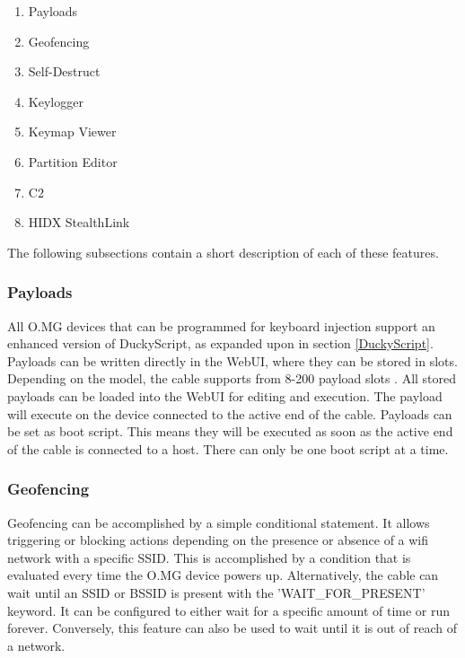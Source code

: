 \begin{enumerate}
    \item Payloads
    \item Geofencing
    \item Self-Destruct
    \item Keylogger
    \item Keymap Viewer
    \item Partition Editor
    \item C2
    \item HIDX StealthLink
\end{enumerate}

The following subsections contain a short description of each of these features. 

\subsubsection{Payloads}

All O.MG devices that can be programmed for keyboard injection support an enhanced version of DuckyScript, as expanded upon in section \ref{DuckyScript}. \\
Payloads can be written directly in the WebUI, where they can be stored in slots. Depending on the model, the cable supports from 8-200 payload slots \cite{hak5MGCable}. All stored payloads can be loaded into the WebUI for editing and execution. The payload will execute on the device connected to the active end of the cable. Payloads can be set as boot script. This means they will be executed as soon as the active end of the cable is connected to a host. There can only be one boot script at a time. \\



\subsubsection{Geofencing}

Geofencing can be accomplished by a simple conditional statement. It allows triggering or blocking actions depending on the presence or absence of a wifi network with a specific SSID. This is accomplished by a condition that is evaluated every time the O.MG device powers up. Alternatively, the cable can wait until an SSID or BSSID is present with the 'WAIT\_FOR\_PRESENT' keyword.
It can be configured to either wait for a specific amount of time or run forever. Conversely, this feature can also be used to wait until it is out of reach of a network.

